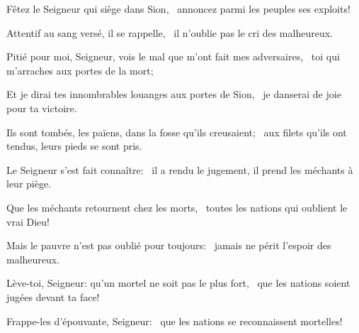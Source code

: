\item Fêtez le Seigneur qui siège dans Sion,~\psstar{} annoncez parmi les peuples ses exploits!
\item Attentif au sang versé, il se rappelle,~\psstar{} il n'oublie pas le cri des malheureux.
\item Pitié pour moi, Seigneur, vois le mal que m'ont fait mes adversaires,~\psstar{} toi qui m'arraches aux portes de la mort;
\item Et je dirai tes innombrables louanges aux portes de Sion,~\psstar{} je danserai de joie pour ta victoire.
\item Ils sont tombés, les païens, dans la fosse qu'ils creusaient;~\psstar{} aux filets qu'ils ont tendus, leurs pieds se sont pris.
\item Le Seigneur s'est fait connaître:~\psstar{} il a rendu le jugement, il prend les méchants à leur piège.
\item Que les méchants retournent chez les morts,~\psstar{} toutes les nations qui oublient le vrai Dieu!
\item Mais le pauvre n'est pas oublié pour toujours:~\psstar{} jamais ne périt l'espoir des malheureux.
\item Lève-toi, Seigneur: qu'un mortel ne soit pas le plus fort,~\psstar{} que les nations soient jugées devant ta face!
\item Frappe-les d'épouvante, Seigneur:~\psstar{} que les nations se reconnaissent mortelles!